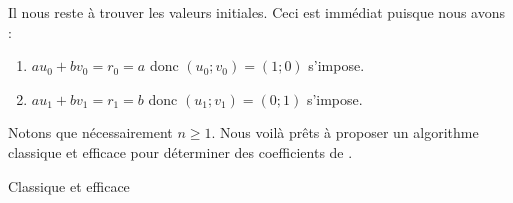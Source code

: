Il nous reste à trouver les valeurs initiales. Ceci est immédiat puisque nous avons :

\begin{enumerate}
	\item $a u_0 + b v_0 = r_0 = a$ donc $(u_0 ; v_0) = (1 ; 0)$ s'impose.

	\item $a u_1 + b v_1 = r_1 = b$ donc $(u_1 ; v_1) = (0 ; 1)$ s'impose.
\end{enumerate}


Notons que nécessairement $n \geq 1$. Nous voilà prêts à proposer un algorithme classique et efficace pour déterminer des coefficients de \bb.


{\small
\begin{algo}[frame]
	\caption{Classique et efficace} \label{algo-efficient}
	\BlankLine
\end{algo}
}
